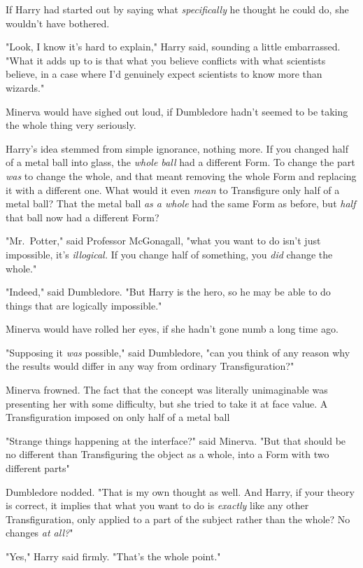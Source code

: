If Harry had started out by saying what \emph{specifically} he thought he could
do, she wouldn't have bothered.

"Look, I know it's hard to explain," Harry said, sounding a little embarrassed.
"What it adds up to is that what you believe conflicts with what scientists
believe, in a case where I'd genuinely expect scientists to know more than
wizards."

Minerva would have sighed out loud, if Dumbledore hadn't seemed to be taking
the whole thing very seriously.

Harry's idea stemmed from simple ignorance, nothing more. If you changed half
of a metal ball into glass, the \emph{whole ball} had a different Form. To
change the part \emph{was} to change the whole, and that meant removing the
whole Form and replacing it with a different one. What would it even
\emph{mean} to Transfigure only half of a metal ball? That the metal ball
\emph{as a whole} had the same Form as before, but \emph{half} that ball now
had a different Form?

"Mr.~Potter," said Professor McGonagall, "what you want to do isn't just
impossible, it's \emph{illogical.} If you change half of something, you
\emph{did} change the whole."

"Indeed," said Dumbledore. "But Harry is the hero, so he may be able to do
things that are logically impossible."

Minerva would have rolled her eyes, if she hadn't gone numb a long time ago.

"Supposing it \emph{was} possible," said Dumbledore, "can you think of any
reason why the results would differ in any way from ordinary Transfiguration?"

Minerva frowned. The fact that the concept was literally unimaginable was
presenting her with some difficulty, but she tried to take it at face value. A
Transfiguration imposed on only half of a metal ball{\el}

"Strange things happening at the interface?" said Minerva. "But that should be
no different than Transfiguring the object as a whole, into a Form with two
different parts{\el}"

Dumbledore nodded. "That is my own thought as well. And Harry, if your theory
is correct, it implies that what you want to do is \emph{exactly} like any
other Transfiguration, only applied to a part of the subject rather than the
whole? No changes \emph{at all?}"

"Yes," Harry said firmly. "That's the whole point."

